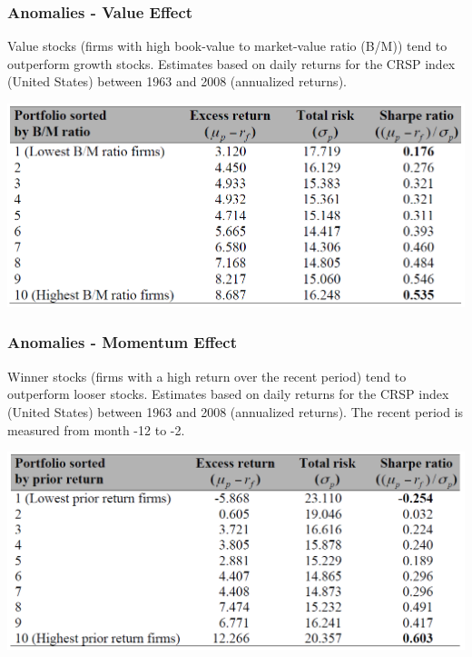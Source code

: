 \documentclass[xcolor=dvipsnames, english, 8pt]{beamer}
\begin{document}
\begin{frame}
    \frametitle{Anomalies - Value Effect}
    {\color{ubRed}Value stocks} (firms with high book-value to market-value ratio (B/M)) tend to
    outperform {\color{ubRed}growth stocks}.
    Estimates based on daily returns for the CRSP index (United States) between 1963 and
    2008 (annualized returns).\vspace{0.25cm}\\
\begin{center}
    \includegraphics[scale=0.4]{ANO2}
\end{center}
\end{frame}

\begin{frame}
    \frametitle{Anomalies - Momentum Effect}
    {\color{ubRed}Winner stocks} (firms with a high return over the recent period) tend to outperform
{\color{ubRed}looser stocks}.
Estimates based on daily returns for the CRSP index (United States) between 1963 and
2008 (annualized returns). The recent period is measured from month -12 to -2.\vspace{0.25cm}\\
\begin{center}
    \includegraphics[scale=0.4]{ANO3}
\end{center}
\end{frame}
\end{document}
